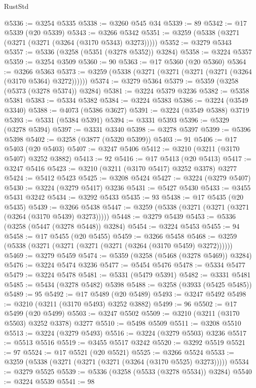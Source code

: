 \begin{lexlean}{RustStd}
\begin{coremodule}
@5336 := @3254 @5335
@5338 := @3260 @545 @34
@5339 := 89
@5342 := @17 @5339 (@20 @5339)
@5343 := @3266 @5342
@5351 := @3259 (@5338 (@3271 (@3271 (@3271 (@3264 (@3170 @5343) @3273)))))
@5352 := @3279 @5343
@5357 := @5336 (@3258 (@5351 (@3278 @5352)) @3284)
@5358 := @3224 @5357
@5359 := @3254 @3509
@5360 := 90
@5363 := @17 @5360 (@20 @5360)
@5364 := @3266 @5363
@5373 := @3259 (@5338 (@3271 (@3271 (@3271 (@3271 (@3264 (@3170 @5364) @3272))))))
@5374 := @3279 @5364
@5379 := @5359 (@3258 (@5373 (@3278 @5374)) @3284)
@5381 := @3224 @5379 @3236
@5382 := @5358 @5381
@5383 := @5334 @5382
@5384 := @3224 @5383
@5386 := @3224 (@3549 @3340)
@5388 := @4073 (@5386 @3627)
@5391 := @3224 (@3549 @5388) @3719
@5393 := @5331 (@5384 @5391)
@5394 := @3331 @5393
@5396 := @5329 (@3278 @5394)
@5397 := @3331 @3340
@5398 := @3278 @5397
@5399 := @5396 @5398
@5402 := @3258 (@3877 (@5320 @5399))
@5403 := 91
@5406 := @17 @5403 (@20 @5403)
@5407 := @3247 @5406
@5412 := @3210 (@3211 (@3170 @5407) @3252 @3882)
@5413 := 92
@5416 := @17 @5413 (@20 @5413)
@5417 := @3247 @5416
@5423 := @3210 (@3211 (@3170 @5417) @3252 @3378) @3277
@5424 := @5412 @5423
@5425 := @3208 @5424
@5427 := @3224 (@3279 @5407)
@5430 := @3224 (@3279 @5417) @3236
@5431 := @5427 @5430
@5433 := @3455 @5431 @3242
@5434 := @3292 @5433
@5435 := 93
@5438 := @17 @5435 (@20 @5435)
@5439 := @3266 @5438
@5447 := @3259 (@5338 (@3271 (@3271 (@3271 (@3264 (@3170 @5439) @3273)))))
@5448 := @3279 @5439
@5453 := @5336 (@3258 (@5447 (@3278 @5448)) @3284)
@5454 := @3224 @5453
@5455 := 94
@5458 := @17 @5455 (@20 @5455)
@5459 := @3266 @5458
@5468 := @3259 (@5338 (@3271 (@3271 (@3271 (@3271 (@3264 (@3170 @5459) @3272))))))
@5469 := @3279 @5459
@5474 := @5359 (@3258 (@5468 (@3278 @5469)) @3284)
@5476 := @3224 @5474 @3236
@5477 := @5454 @5476
@5478 := @5334 @5477
@5479 := @3224 @5478
@5481 := @5331 (@5479 @5391)
@5482 := @3331 @5481
@5485 := @5434 (@3278 @5482) @5398
@5488 := @3258 (@3933 (@5425 @5485))
@5489 := 95
@5492 := @17 @5489 (@20 @5489)
@5493 := @3247 @5492
@5498 := @3210 (@3211 (@3170 @5493) @3252 @3882)
@5499 := 96
@5502 := @17 @5499 (@20 @5499)
@5503 := @3247 @5502
@5509 := @3210 (@3211 (@3170 @5503) @3252 @3378) @3277
@5510 := @5498 @5509
@5511 := @3208 @5510
@5513 := @3224 (@3279 @5493)
@5516 := @3224 (@3279 @5503) @3236
@5517 := @5513 @5516
@5519 := @3455 @5517 @3242
@5520 := @3292 @5519
@5521 := 97
@5524 := @17 @5521 (@20 @5521)
@5525 := @3266 @5524
@5533 := @3259 (@5338 (@3271 (@3271 (@3271 (@3264 (@3170 @5525) @3273)))))
@5534 := @3279 @5525
@5539 := @5336 (@3258 (@5533 (@3278 @5534)) @3284)
@5540 := @3224 @5539
@5541 := 98

\end{coremodule}
\end{lexlean}
